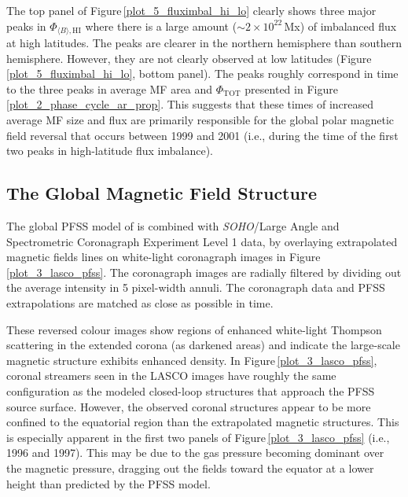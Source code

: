 \documentclass[namedreferences]{solarphysics}
\begin{document}
\begin{article}
The top panel of Figure\,\ref{plot_5_fluximbal_hi_lo} clearly shows three major peaks in $\Phi_{\langle B \rangle,\mathrm{HI}}$ where there is a large amount ($\sim$$2\times10^{22}$\,Mx) of imbalanced flux at high latitudes. The peaks are clearer in the northern hemisphere than southern hemisphere. However, they are not clearly observed at low latitudes (Figure\,\ref{plot_5_fluximbal_hi_lo}, bottom panel). The peaks roughly correspond in time to the three peaks in average MF area and $\Phi_\mathrm{TOT}$ presented in Figure\,\ref{plot_2_phase_cycle_ar_prop}. This suggests that these times of increased average MF size and flux are primarily responsible for the global polar magnetic field reversal that occurs between 1999 and 2001 (i.e., during the time of the first two peaks in high-latitude flux imbalance).


\subsection{The Global Magnetic Field Structure}


The global PFSS model of \citet{Schrijver:2003} is combined with \emph{SOHO}/Large Angle and Spectrometric Coronagraph Experiment \citep[LASCO;][]{brueckner:1995} Level 1 data, by overlaying extrapolated magnetic fields lines on white-light coronagraph images in Figure\,\ref{plot_3_lasco_pfss}. The coronagraph images are radially filtered by dividing out the average intensity in 5 pixel-width annuli. The coronagraph data and PFSS extrapolations are matched as close as possible in time. 

These reversed colour images show regions of enhanced white-light Thompson scattering in the extended corona (as darkened areas) and indicate the large-scale magnetic structure exhibits enhanced density. In Figure\,\ref{plot_3_lasco_pfss}, coronal streamers seen in the LASCO images have roughly the same configuration as the modeled closed-loop structures that approach the PFSS source surface. However, the observed coronal structures appear to be more confined to the equatorial region than the extrapolated magnetic structures. This is especially apparent in the first two panels of Figure\,\ref{plot_3_lasco_pfss} (i.e., 1996 and 1997). This may be due to the gas pressure becoming dominant over the magnetic pressure, dragging out the fields toward the equator at a lower height than predicted by the PFSS model.



\end{article}
\end{document}
